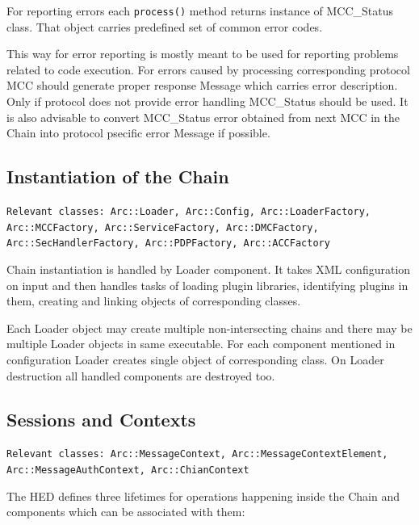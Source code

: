 \documentclass{book}
\begin{document}
For reporting errors each \texttt{process()} method returns instance of MCC\_Status class. That object carries predefined set of common error codes.

This way for error reporting is mostly meant to be used for reporting problems related to code execution. For errors caused by processing corresponding protocol MCC should generate proper response Message which carries error description. Only if protocol does not provide error handling MCC\_Status should be used. It is also advisable to convert MCC\_Status error obtained from next MCC in the Chain into protocol psecific error Message if possible.


\subsection{Instantiation of the Chain}

\texttt{Relevant classes: Arc::Loader, Arc::Config, Arc::LoaderFactory, Arc::MCCFactory, Arc::ServiceFactory, Arc::DMCFactory, Arc::SecHandlerFactory, Arc::PDPFactory, Arc::ACCFactory}

Chain instantiation is handled by Loader component. It takes XML configuration on input and then handles tasks of loading plugin libraries, identifying plugins in them, creating and linking objects of corresponding classes.

Each Loader object may create multiple non-intersecting chains and there may be multiple Loader objects in same executable. For each component mentioned in configuration Loader creates single object of corresponding class. On Loader destruction all handled components are destroyed too.


\subsection{Sessions and Contexts}

\texttt{Relevant classes: Arc::MessageContext, Arc::MessageContextElement, Arc::MessageAuthContext, Arc::ChianContext }

The HED defines three lifetimes for operations happening inside the Chain and components which can be associated with them:

\end{document}
